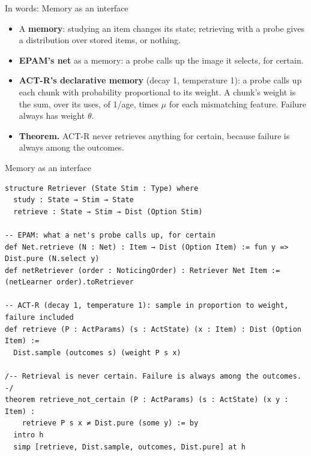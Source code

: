 \documentclass[aspectratio=169,11pt]{beamer}
\begin{document}
\begin{frame}{In words: Memory as an interface}
  \begin{itemize}
    \item A \textbf{memory}: studying an item changes its state; retrieving with a probe gives a distribution over stored items, or nothing.
    \item \textbf{EPAM's net} as a memory: a probe calls up the image it selects, for certain.
    \item \textbf{ACT-R's declarative memory} (decay 1, temperature 1): a probe calls up each chunk with probability proportional to its weight. A chunk's weight is the sum, over its uses, of 1/age, times $\mu$ for each mismatching feature. Failure always has weight $\theta$.
    \item \textbf{Theorem.} ACT-R never retrieves anything for certain, because failure is always among the outcomes.
  \end{itemize}
\end{frame}


\begin{frame}[fragile]{Memory as an interface}
\begin{Verbatim}
structure Retriever (State Stim : Type) where
  study : State → Stim → State
  retrieve : State → Stim → Dist (Option Stim)

-- EPAM: what a net's probe calls up, for certain
def Net.retrieve (N : Net) : Item → Dist (Option Item) := fun y => Dist.pure (N.select y)
def netRetriever (order : NoticingOrder) : Retriever Net Item := (netLearner order).toRetriever

-- ACT-R (decay 1, temperature 1): sample in proportion to weight, failure included
def retrieve (P : ActParams) (s : ActState) (x : Item) : Dist (Option Item) :=
  Dist.sample (outcomes s) (weight P s x)

/-- Retrieval is never certain. Failure is always among the outcomes. -/
theorem retrieve_not_certain (P : ActParams) (s : ActState) (x y : Item) :
    retrieve P s x ≠ Dist.pure (some y) := by
  intro h
  simp [retrieve, Dist.sample, outcomes, Dist.pure] at h
\end{Verbatim}
\end{frame}
\end{document}

